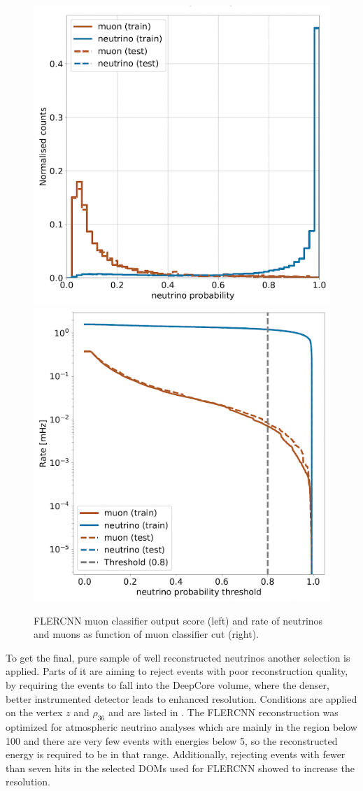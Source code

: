 \begin{figure}
\includegraphics[width=0.49\linewidth]{figures/simulation_and_processing/flercnn/flercnn_muon_classifier.png}
\includegraphics[width=0.49\linewidth]{figures/simulation_and_processing/flercnn/flercnn_muon_classifier_rate_vs_threshold.png}
\caption[FLERCNN muon classifier probability distributions]{FLERCNN muon classifier output score (left) and rate of neutrinos and muons as function of muon classifier cut (right).}
\end{figure}

To get the final, pure sample of well reconstructed neutrinos another selection is applied. Parts of it are aiming to reject events with poor reconstruction quality, by requiring the events to fall into the DeepCore volume, where the denser, better instrumented detector leads to enhanced resolution. Conditions are applied on the vertex $z$ and $\rho_{36}$ and are listed in . The FLERCNN reconstruction was optimized for atmospheric neutrino analyses which are mainly in the region below \SI{100}{\gev} and there are very few events with energies below \SI{5}{\gev}, so the reconstructed energy is required to be in that range. Additionally, rejecting events with fewer than seven hits in the selected DOMs used for FLERCNN showed to increase the resolution.

